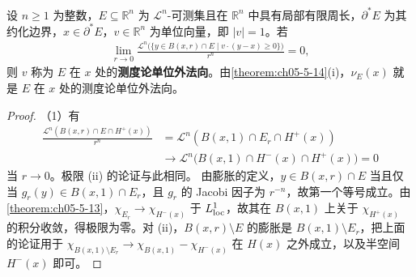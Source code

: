 \documentclass[../../main.tex]{subfiles}%
\begin{document}
\begin{definition}[测度论单位外法向]\label{definition:ch05-5-6}
设 $n\geqslant1$ 为整数，$E\subseteq\mathbb{R}^n$ 为 $\mathcal{L}^n$-可测集且在 $\mathbb{R}^n$ 中具有局部有限周长，$\partial^*E$ 为其约化边界，$x\in\partial^*E$，$v\in\mathbb{R}^n$ 为单位向量，即 $\lvert v\rvert=1$。若
\begin{align*}
\lim_{r\to0}\frac{\mathcal{L}^n\bigl(\{y\in B(x,r)\cap E\mid v\cdot(y-x)\geqslant0\}\bigr)}{r^n}=0,
\end{align*}
则 $v$ 称为 $E$ 在 $x$ 处的\textbf{测度论单位外法向}。由\cref{theorem:ch05-5-14}(i)，$\nu_E(x)$ 就是 $E$ 在 $x$ 处的测度论单位外法向。%
\end{definition}

\begin{proof}
（1）有
\begin{align*}
\frac{\mathcal{L}^n(B(x,r)\cap E\cap H^+(x))}{r^n}
&=\mathcal{L}^n(B(x,1)\cap E_r\cap H^+(x))\\
&\to\mathcal{L}^n\bigl(B(x,1)\cap H^-(x)\cap H^+(x)\bigr)=0
\end{align*}
当 $r\to0$。极限 (ii) 的论证与此相同。
由膨胀的定义，$y\in B(x,r)\cap E$ 当且仅当 $g_r(y)\in B(x,1)\cap E_r$，且 $g_r$ 的 Jacobi 因子为 $r^{-n}$，故第一个等号成立。由\cref{theorem:ch05-5-13}，$\chi_{E_r}\to\chi_{H^-(x)}$ 于 $L^1_{\mathrm{loc}}$，故其在 $B(x,1)$ 上关于 $\chi_{H^+(x)}$ 的积分收敛，得极限为零。对 (ii)，$B(x,r)\setminus E$ 的膨胀是 $B(x,1)\setminus E_r$，把上面的论证用于 $\chi_{B(x,1)\setminus E_r}\to\chi_{B(x,1)}-\chi_{H^-(x)}$ 在 $H(x)$ 之外成立，以及半空间 $H^-(x)$ 即可。%


\end{proof}
\end{document}
